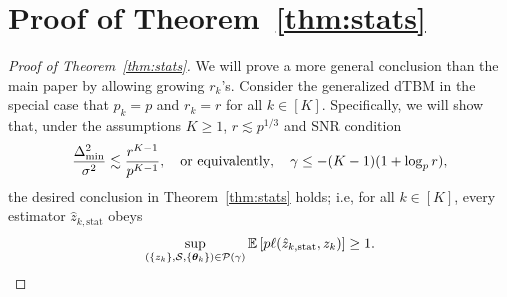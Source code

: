 \documentclass[lettersize,onecolumn,journal]{IEEEtran}
\theoremstyle{definition}
\theoremstyle{definition}
\begin{document}
\section*{Proof of Theorem~\ref{thm:stats}}

\begin{proof}[Proof of Theorem~\ref{thm:stats}]
We will prove a more general conclusion than the main paper by allowing growing $r_k$'s. Consider the generalized dTBM in the special case that $p_k = p$ and $r_k = r$ for all $ k\in [K]$. Specifically, we will show that, under 
the assumptions $K\geq 1$, $r\lesssim p^{1/3}$ and SNR condition
\[
{\Delta^2_{\min}\over \sigma^2}\lesssim {r^{K-1}\over p^{K-1}},\quad \text{or equivalently}, \quad \gamma\leq -(K-1)(1+\log_p r),
\]
 the desired conclusion in Theorem~\ref{thm:stats} holds; i.e, for all $k \in [K]$, every estimator $\hat z_{k,\text{stat}}$ obeys
\begin{equation}\label{eq:max}
    \sup_{(\{z_k\}, \tS, \{\mtheta_k\}) \in \tP(\gamma)} \bbE \left[ p\ell(\hat z_{k,\text{stat}}, z_k) \right]\geq 1.
\end{equation}


\end{proof}
\end{document}
